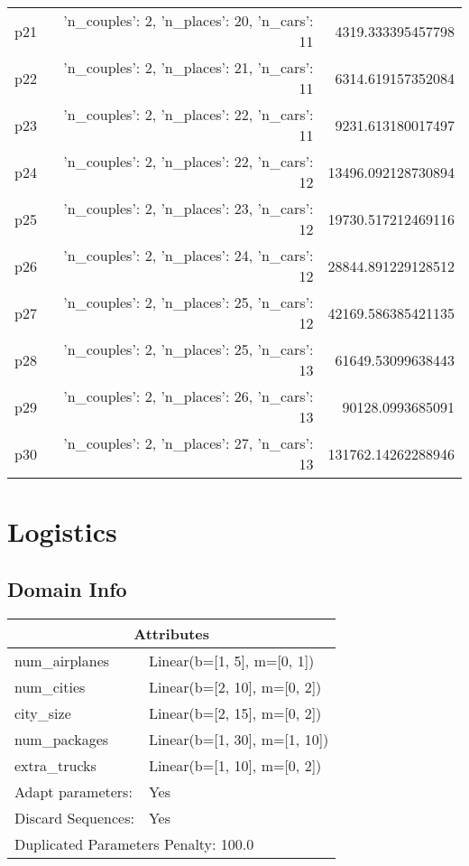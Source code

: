 \documentclass{article}
\begin{document}
\begin{center}
\begin{tabular}{r|r|r}
  p21&{'n\_couples': 2, 'n\_places': 20, 'n\_cars': 11}&4319.333395457798\\
  p22&{'n\_couples': 2, 'n\_places': 21, 'n\_cars': 11}&6314.619157352084\\
  p23&{'n\_couples': 2, 'n\_places': 22, 'n\_cars': 11}&9231.613180017497\\
  p24&{'n\_couples': 2, 'n\_places': 22, 'n\_cars': 12}&13496.092128730894\\
  p25&{'n\_couples': 2, 'n\_places': 23, 'n\_cars': 12}&19730.517212469116\\
  p26&{'n\_couples': 2, 'n\_places': 24, 'n\_cars': 12}&28844.891229128512\\
  p27&{'n\_couples': 2, 'n\_places': 25, 'n\_cars': 12}&42169.586385421135\\
  p28&{'n\_couples': 2, 'n\_places': 25, 'n\_cars': 13}&61649.53099638443\\
  p29&{'n\_couples': 2, 'n\_places': 26, 'n\_cars': 13}&90128.0993685091\\
  p30&{'n\_couples': 2, 'n\_places': 27, 'n\_cars': 13}&131762.14262288946
                            \end{tabular}
                            \end{center}
                    
                            \newpage \section{Logistics}
                    \subsection*{Domain Info}

                    \begin{center}
                    \begin{tabular}{p{}p{}}
                    \multicolumn{2}{c}{\bf \large Attributes}\\\midrule
                    num\_airplanes & Linear(b=[1, 5], m=[0, 1])\\
num\_cities & Linear(b=[2, 10], m=[0, 2])\\
city\_size & Linear(b=[2, 15], m=[0, 2])\\
num\_packages & Linear(b=[1, 30], m=[1, 10])\\
extra\_trucks & Linear(b=[1, 10], m=[0, 2])
                    
                    \\\midrule
                    Adapt parameters: & Yes
                
                    
                                \\\midrule
                                Discard Sequences: & Yes
                             \\\midrule
                    \multicolumn{2}{l}{Duplicated Parameters Penalty: 100.0}
                    \end{tabular}
                    \end{center}
                
\end{document}
